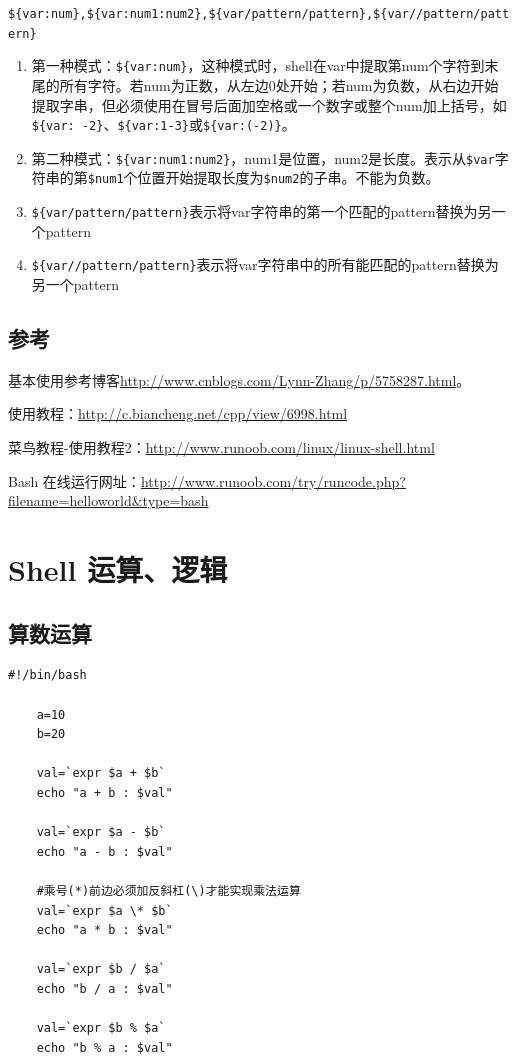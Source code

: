 \documentclass[UTF8,a4paper,12pt]{ctexbook}
\begin{document}
					\verb|${var:num},${var:num1:num2},${var/pattern/pattern},${var//pattern/pattern}|
					
				\begin{enumerate}
					\item 第一种模式：\verb|${var:num}|，这种模式时，shell在var中提取第num个字符到末尾的所有字符。若num为正数，从左边0处开始；若num为负数，从右边开始提取字串，但必须使用在冒号后面加空格或一个数字或整个num加上括号，如\verb|${var: -2}|、\verb|${var:1-3}|或\verb|${var:(-2)}|。  
					
					\item 第二种模式：\verb|${var:num1:num2}|，num1是位置，num2是长度。表示从\verb|$var|字符串的第\verb|$num1|个位置开始提取长度为\verb|$num2|的子串。不能为负数。
					
					\item \verb|${var/pattern/pattern}|表示将var字符串的第一个匹配的pattern替换为另一个pattern
					\item \verb|${var//pattern/pattern}|表示将var字符串中的所有能匹配的pattern替换为另一个pattern		
				\end{enumerate}
	    \section{参考}基本使用参考博客\url{http://www.cnblogs.com/Lynn-Zhang/p/5758287.html}。
		 
			 使用教程：\url{http://c.biancheng.net/cpp/view/6998.html}
			 
			 菜鸟教程-使用教程2：\url{http://www.runoob.com/linux/linux-shell.html}
			 
			 Bash 在线运行网址：\url{http://www.runoob.com/try/runcode.php?filename=helloworld&type=bash}

\chapter{Shell 运算、逻辑}
	
	\section{算数运算}
			 \begin{lstlisting}[xleftmargin=.06\textwidth]
	#!/bin/bash
	
	a=10
	b=20
	
	val=`expr $a + $b`
	echo "a + b : $val"
	
	val=`expr $a - $b`
	echo "a - b : $val"
	
	#乘号(*)前边必须加反斜杠(\)才能实现乘法运算
	val=`expr $a \* $b`
	echo "a * b : $val"
	
	val=`expr $b / $a`
	echo "b / a : $val"
	
	val=`expr $b % $a`
	echo "b % a : $val"
			 \end{lstlisting}
\end{document}
